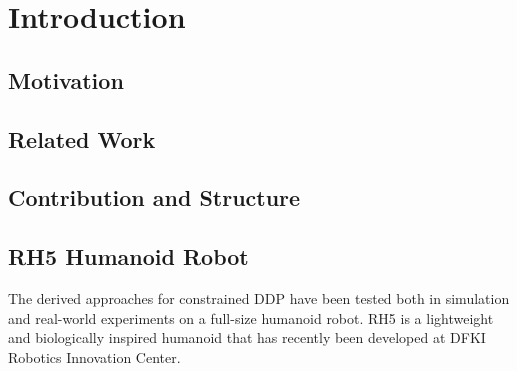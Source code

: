 
\chapter{Introduction}\label{c1}

\section{Motivation}
\section{Related Work}


\section{Contribution and Structure}


\section{RH5 Humanoid Robot}
The derived approaches for constrained \gls{DDP} have been tested both in simulation and real-world experiments on a full-size humanoid robot. RH5 is a lightweight and biologically inspired humanoid that has recently been developed at DFKI Robotics Innovation Center\cite{peters2017konstruktion}.

